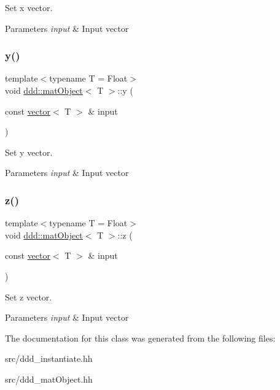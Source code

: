 Set x vector. 


\begin{DoxyParams}{Parameters}
{\em input} & Input vector \\
\hline
\end{DoxyParams}
\mbox{\label{classddd_1_1mat_object_a638f5c083ccd96c6742f062d35810193}} 
\subsubsection{\texorpdfstring{y()}{y()}}
{\footnotesize\ttfamily template$<$typename T  = Float$>$ \\
void \hyperlink{classddd_1_1mat_object}{ddd\+::mat\+Object}$<$ T $>$\+::y (\begin{DoxyParamCaption}\item[{const \hyperlink{classddd_1_1vector}{vector}$<$ T $>$ \&}]{input }\end{DoxyParamCaption})\hspace{0.3cm}{\ttfamily [inline]}}



Set y vector. 


\begin{DoxyParams}{Parameters}
{\em input} & Input vector \\
\hline
\end{DoxyParams}
\mbox{\label{classddd_1_1mat_object_ae234d843cfd0a90b5e67b946ec18bfea}} 
\subsubsection{\texorpdfstring{z()}{z()}}
{\footnotesize\ttfamily template$<$typename T  = Float$>$ \\
void \hyperlink{classddd_1_1mat_object}{ddd\+::mat\+Object}$<$ T $>$\+::z (\begin{DoxyParamCaption}\item[{const \hyperlink{classddd_1_1vector}{vector}$<$ T $>$ \&}]{input }\end{DoxyParamCaption})\hspace{0.3cm}{\ttfamily [inline]}}



Set z vector. 


\begin{DoxyParams}{Parameters}
{\em input} & Input vector \\
\hline
\end{DoxyParams}


The documentation for this class was generated from the following files\+:\begin{DoxyCompactItemize}
\item 
src/ddd\+\_\+instantiate.\+hh\item 
src/ddd\+\_\+mat\+Object.\+hh\end{DoxyCompactItemize}
